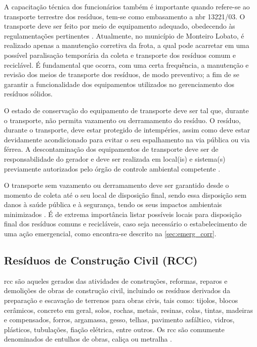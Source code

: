 	A capacitação técnica dos funcionários também é importante quando refere-se ao transporte terrestre dos resíduos, tem-se como embasamento a \gls{nbr} 13221/03. O transporte deve ser feito por meio de equipamento adequado, obedecendo às regulamentações pertinentes \cite{abnt:13221:2003}. Atualmente, no município de Monteiro Lobato, é realizado apenas a manutenção corretiva da frota, a qual pode acarretar em uma possível paralisação temporária da coleta e transporte dos resíduos comum e reciclável. É fundamental que ocorra, com uma certa frequência, a manutenção e revisão dos meios de transporte dos resíduos, de modo preventivo; a fim de se garantir a funcionalidade dos equipamentos utilizados no gerenciamento dos resíduos sólidos.
	
	O estado de conservação do equipamento de transporte deve ser tal que, durante o transporte, não permita vazamento ou derramamento do resíduo. O resíduo, durante o transporte, deve estar protegido de intempéries,  assim como deve estar devidamente
	acondicionado para evitar o seu espalhamento na via pública ou via férrea. A descontaminação dos equipamentos de transporte deve ser de responsabilidade do gerador e deve ser realizada em local(is) e sistema(s) previamente autorizados pelo órgão de controle ambiental competente \cite{abnt:13221:2003}.
	
	O transporte sem vazamento ou derramamento deve ser garantido desde o momento de coleta até o seu local de disposição final, sendo essa disposição sem danos à saúde pública e à  segurança, tendo os seus impactos ambientais minimizados \cite{abnt:8419}. É de extrema importância listar possíveis locais para disposição final dos resíduos comuns e recicláveis, caso seja necessário o estabelecimento de uma ação emergencial, como encontra-se descrito na \autoref{sec:emerg_corr}.
	
	\subsection{Resíduos de Construção Civil (RCC)}
	\label{subsec:trans_rcc}
	\gls{rcc} são aqueles gerados das atividades de construções, reformas, reparos e demolições de obras de construção civil, incluindo os resíduos derivados da preparação e escavação de terrenos para obras civis, tais como: tijolos, blocos cerâmicos, concreto em geral, solos, rochas, metais, resinas, colas, tintas, madeiras e compensados, forros, argamassa, gesso, telhas, pavimento asfáltico, vidros, plásticos, tubulações, fiação elétrica, entre outros. Os \gls{rcc} são comumente denominados de entulhos de obras, caliça ou metralha \cite{brasil:12305, conama:307}. 
	
